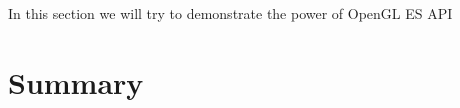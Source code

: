 \documentclass[a4paper,11pt]{article}
\renewenvironment{abstract}
{\itshape \small
  \begin{center}
  \bfseries \abstractname\vspace{-.5em}\vspace{0pt}
  \end{center}
  \list{}{
    \setlength{\leftmargin}{1.5cm}%
    \setlength{\rightmargin}{\leftmargin}%
  }%
  \item\relax}
{\endlist}
\begin{document}
\begin{abstract}
In this section we will try to demonstrate the power of OpenGL ES API 




\section{Summary} 


\clearpage
\label{Bibliography} 
%

\footnotesize{  }
\end{document}
